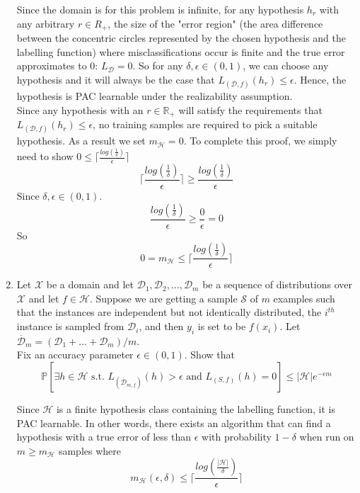 \documentclass[12pt]{article}
\begin{document}
\begin{enumerate}
    Since the domain is for this problem is infinite, for any hypothesis $h_r$ with any arbitrary $r\in R_{+}$, the size of the "error region" (the area difference between the concentric circles represented by the chosen hypothesis and the labelling function) where misclassifications occur is finite and the true error approximates to 0: $L_{\mathcal{D}}=0$. So for any $\delta,\epsilon\in(0,1)$, we can choose any hypothesis and it will always be the case that $L_{(\mathcal{D},f)}(h_r)\leq \epsilon$. Hence, the hypothesis is PAC learnable under the realizability assumption.\\

    Since any hypothesis with an $r\in\mathbb{R}_{+}$ will satisfy the requirements that $L_{(\mathcal{D},f)}(h_r)\leq \epsilon$, no training samples are required to pick a suitable hypothesis. As a result we set $m_\mathcal{H}=0$. To complete this proof, we simply need to show $0\leq\lceil \frac{log(\frac{1}{\delta})}{\epsilon}\rceil$
    $$\lceil \frac{log(\frac{1}{\delta})}{\epsilon}\rceil\geq\frac{log(\frac{1}{\delta})}{\epsilon}$$
    Since $\delta,\epsilon\in(0,1)$.
    $$\frac{log(\frac{1}{\delta})}{\epsilon}\geq\frac{0}{\epsilon}=0$$
    So
    $$0=m_{\mathcal{H}}\leq\lceil \frac{log(\frac{1}{\delta})}{\epsilon}\rceil$$
    \item Let $\mathcal{X}$ be a domain and let $\mathcal{D}_1,\mathcal{D}_2,...,\mathcal{D}_m$ be a sequence of distributions over $\mathcal{X}$ and let $f\in\mathcal{H}$. Suppose we are getting a sample $\mathcal{S}$ of $m$ examples such that the instances are independent but not identically distributed, the $i^{th}$ instance is sampled from $\mathcal{D}_i$, and then $y_i$ is set to be $f(x_i)$. Let $\overline{\mathcal{D}}_m=(\mathcal{D}_1+...+\mathcal{D}_m)/m$.\\
    Fix an accuracy parameter $\epsilon\in (0,1)$. Show that$$\mathbb{P}[\exists h\in \mathcal{H}\text{ s.t. }L_{(\overline{\mathcal{D}}_{m,f})}(h)>\epsilon \text{ and } L_{(S,f)}(h)=0]\leq |\mathcal{H}|e^{-\epsilon m}$$

    Since $\mathcal{H}$ is a finite hypothesis class containing the labelling function, it is PAC learnable. In other words, there exists an algorithm that can find a hypothesis with a true error of less than $\epsilon$ with probability $1-\delta$ when run on $m\geq m_\mathcal{H}$ samples where $$m_\mathcal{H}(\epsilon,\delta)\leq\lceil \frac{log(\frac{|\mathcal{H}|}{\delta})}{\epsilon}\rceil$$


\end{enumerate}
\end{document}
